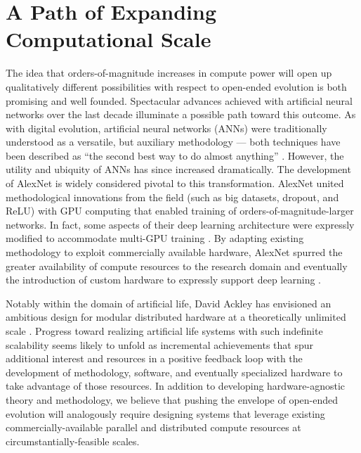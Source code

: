 \noindent{}

\section{A Path of Expanding Computational Scale}

The idea that orders-of-magnitude increases in compute power will open up qualitatively different possibilities with respect to open-ended evolution is both promising and well founded.
Spectacular advances achieved with artificial neural networks over the last decade illuminate a possible path toward this outcome.
As with digital evolution, artificial neural networks (ANNs) were traditionally understood as a versatile, but auxiliary methodology --- both techniques have been described as ``the second best way to do almost anything'' \citep{miaoulis2008intelligent,eiben2015introduction}.
However, the utility and ubiquity of ANNs has since increased dramatically.
The development of AlexNet is widely considered pivotal to this transformation.
AlexNet united methodological innovations from the field (such as big datasets, dropout, and ReLU) with GPU computing that enabled training of orders-of-magnitude-larger networks.
In fact, some aspects of their deep learning architecture were expressly modified to accommodate multi-GPU training \citep{krizhevsky2012imagenet}.
By adapting existing methodology to exploit commercially available hardware, AlexNet spurred the greater availability of compute resources to the research domain and eventually the introduction of custom hardware to expressly support deep learning \citep{jouppi2017datacenter}.

Notably within the domain of artificial life, David Ackley has envisioned an ambitious design for modular distributed hardware at a theoretically unlimited scale \citep{ackley2011pursue}.
Progress toward realizing artificial life systems with such indefinite scalability seems likely to unfold as incremental achievements that spur additional interest and resources in a positive feedback loop with the development of methodology, software, and eventually specialized hardware to take advantage of those resources.
In addition to developing hardware-agnostic theory and methodology, we believe that pushing the envelope of open-ended evolution will analogously require designing systems that leverage existing commercially-available parallel and distributed compute resources at circumstantially-feasible scales.

